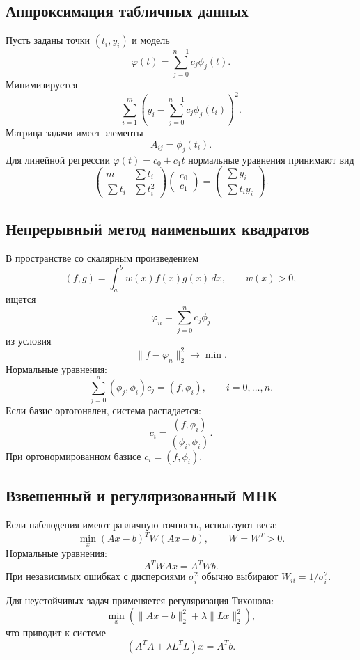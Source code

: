 \subsection{Аппроксимация табличных данных}

Пусть заданы точки $(t_i,y_i)$ и модель
\[
    \varphi(t)=\sum_{j=0}^{n-1}c_j\phi_j(t).
\]
Минимизируется
\[
    \sum_{i=1}^{m}
    \left(y_i-\sum_{j=0}^{n-1}c_j\phi_j(t_i)\right)^2.
\]
Матрица задачи имеет элементы
\[
    A_{ij}=\phi_j(t_i).
\]
Для линейной регрессии $\varphi(t)=c_0+c_1t$ нормальные уравнения принимают вид
\[
\begin{pmatrix}
m&\sum t_i\\
\sum t_i&\sum t_i^2
\end{pmatrix}
\begin{pmatrix}c_0\\c_1\end{pmatrix}
=
\begin{pmatrix}\sum y_i\\\sum t_i y_i\end{pmatrix}.
\]

\subsection{Непрерывный метод наименьших квадратов}

В пространстве со скалярным произведением
\[
    (f,g)=\int_a^b w(x)f(x)g(x)\,dx,
    \qquad w(x)>0,
\]
ищется
\[
    \varphi_n=\sum_{j=0}^{n}c_j\phi_j
\]
из условия
\[
    \|f-\varphi_n\|_2^2\to\min.
\]
Нормальные уравнения:
\[
    \sum_{j=0}^{n}(\phi_j,\phi_i)c_j=(f,\phi_i),
    \qquad i=0,\ldots,n.
\]
Если базис ортогонален, система распадается:
\[
    c_i=\frac{(f,\phi_i)}{(\phi_i,\phi_i)}.
\]
При ортонормированном базисе $c_i=(f,\phi_i)$.

\subsection{Взвешенный и регуляризованный МНК}

Если наблюдения имеют различную точность, используют веса:
\[
    \min_x (Ax-b)^TW(Ax-b),
    \qquad W=W^T>0.
\]
Нормальные уравнения:
\[
    A^TWAx=A^TWb.
\]
При независимых ошибках с дисперсиями $\sigma_i^2$ обычно выбирают
$W_{ii}=1/\sigma_i^2$.

Для неустойчивых задач применяется регуляризация Тихонова:
\[
    \min_x\left(\|Ax-b\|_2^2+\lambda\|Lx\|_2^2\right),
\]
что приводит к системе
\[
    (A^TA+\lambda L^TL)x=A^Tb.
\]

